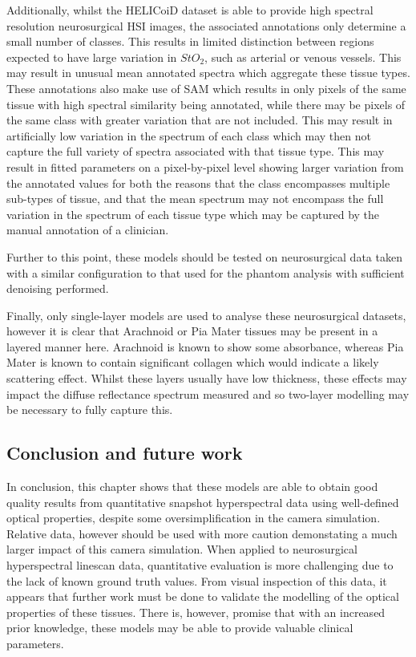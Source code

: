 Additionally, whilst the HELICoiD dataset is able to provide high spectral resolution neurosurgical HSI images, the associated annotations only determine a small number of classes. This results in limited distinction between regions expected to have large variation in $StO_2$, such as arterial or venous vessels. This may result in unusual mean annotated spectra which aggregate these tissue types. These annotations also make use of SAM which results in only pixels of the same tissue with high spectral similarity being annotated, while there may be pixels of the same class with greater variation that are not included. This may result in artificially low variation in the spectrum of each class which may then not capture the full variety of spectra associated with that tissue type. This may result in fitted parameters on a pixel-by-pixel level showing larger variation from the annotated values for both the reasons that the class encompasses multiple sub-types of tissue, and that the mean spectrum may not encompass the full variation in the spectrum of each tissue type which may be captured by the manual annotation of a clinician. %

Further to this point, these models should be tested on neurosurgical data taken with a similar configuration to that used for the phantom analysis with sufficient denoising performed. 

Finally, only single-layer models are used to analyse these neurosurgical datasets, however it is clear that Arachnoid or Pia Mater tissues may be present in a layered manner here. Arachnoid is known to show some absorbance, whereas Pia Mater is known to contain significant collagen which would indicate a likely scattering effect\cite{Ghannam2023}. Whilst these layers usually have low thickness\cite{Ghannam2023}, these effects may impact the diffuse reflectance spectrum measured and so two-layer modelling may be necessary to fully capture this. 

\subsection{Conclusion and future work}
In conclusion, this chapter shows that these models are able to obtain good quality results from quantitative snapshot hyperspectral data using well-defined optical properties, despite some oversimplification in the camera simulation. Relative data, however should be used with more caution demonstating a much larger impact of this camera simulation. When applied to neurosurgical hyperspectral linescan data, quantitative evaluation is more challenging due to the lack of known ground truth values. From visual inspection of this data, it appears that further work must be done to validate the modelling of the optical properties of these tissues. There is, however, promise that with an increased prior knowledge, these models may be able to provide valuable clinical parameters. 

